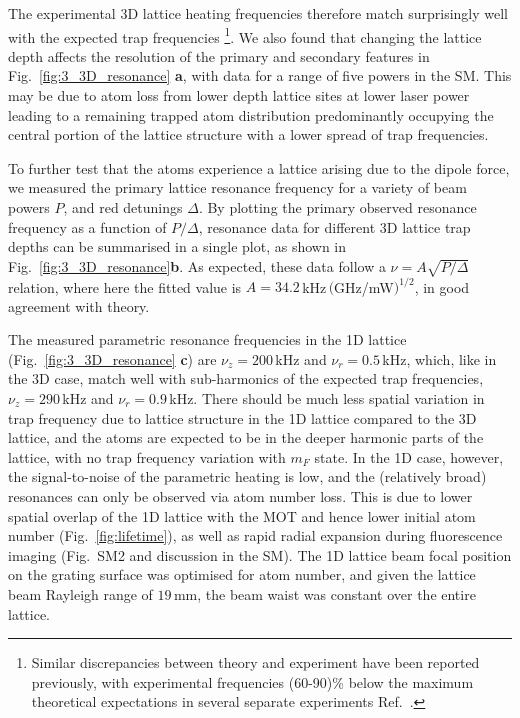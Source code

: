 \documentclass[aps,prl,floatfix,showpacs,twocolumn,amsmath,amssymb,superscriptaddress]{revtex4-2}
\begin{document}
The experimental 3D lattice heating frequencies therefore match surprisingly well with 
the expected trap frequencies \footnote{Similar discrepancies between theory and experiment have been reported previously, with experimental frequencies (60-90)\% below the maximum theoretical expectations in several separate experiments Ref.~\cite{parametric_oscillation_Wu2006}.}. We also found that changing the lattice depth affects the resolution of the primary and secondary features in Fig.~\ref{fig:3_3D_resonance} \textbf{a}, with data for a range of five powers in the SM. 
This may be due to atom loss from lower depth lattice sites at lower laser power leading to a remaining trapped atom distribution predominantly occupying the central portion of the lattice structure with a lower spread of trap frequencies.

To further test that the atoms experience a lattice arising due to the dipole force, we measured the primary lattice resonance frequency for a  variety of beam powers $P$, and red detunings $\Delta$. 
By plotting the primary observed resonance frequency as a function of $P/\Delta$, resonance data for different 3D lattice trap depths can be summarised in a single plot, as shown in Fig.~\ref{fig:3_3D_resonance}\textbf{b}. 
 As expected, these data follow a $\nu=A\sqrt{P/\Delta}$ relation, where here the fitted value is $A=34.2\,$kHz$\,($GHz/mW$)^{1/2}$, in good agreement with theory.
 
The measured parametric resonance frequencies in the 1D lattice (Fig.~\ref{fig:3_3D_resonance} \textbf{c}) are $\nu_{z}=200\,$kHz and $\nu_{r}=0.5\,$kHz, which, like in the 3D case, match well with sub-harmonics of the expected trap frequencies, $\nu_{z}=290\,$kHz and $\nu_{r}=0.9\,$kHz. There should be much less spatial variation in trap frequency due to lattice structure in the 1D lattice compared to the 3D lattice, and the atoms are expected to be in the deeper harmonic parts of the lattice, with no trap frequency variation with $m_F$ state. In the 1D case, however, the signal-to-noise of the parametric heating is low, and the (relatively broad) resonances can only be observed via atom number loss. This is due to lower spatial overlap of the 1D lattice with the MOT and hence lower initial atom number  (Fig.~\ref{fig:lifetime}), as well as rapid radial expansion during fluorescence imaging (Fig.~SM2 and discussion in the SM). The 1D lattice beam focal position on the grating surface was optimised for atom number, and given the lattice beam Rayleigh range of $19\,$mm, the beam waist was constant over the entire lattice.  
\end{document}
